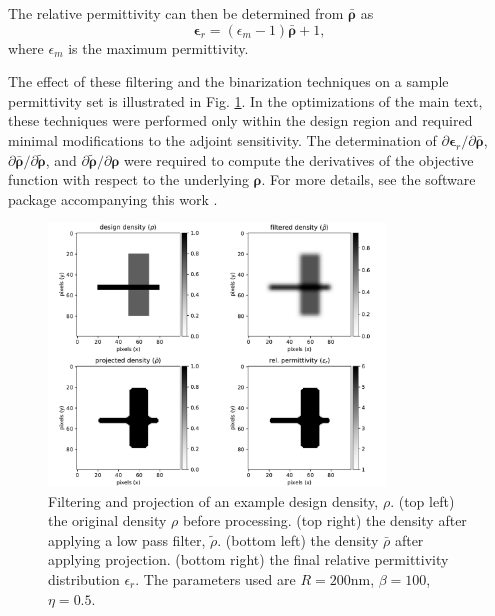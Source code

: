 The relative permittivity can then be determined from $\bm{\bar{\rho}}$ as
\begin{equation}
\bm{\epsilon}_r = (\epsilon_m - 1)\bm{\bar{\rho}} + 1,
\end{equation}
where $\epsilon_m$ is the maximum permittivity. 

The effect of these filtering and the binarization techniques on a sample permittivity set is illustrated in Fig. \ref{fig:filter}. In the optimizations of the main text, these techniques were performed only within the design region and required minimal modifications to the adjoint sensitivity.  The determination of $\partial \bm{\epsilon}_r / \partial \bm{\bar{\rho}}$, $\partial \bm{\bar{\rho}} / \partial \bm{\tilde{\rho}}$, and $\partial \bm{\tilde{\rho}} / \partial \bm{\rho}$ were required to compute the derivatives of the objective function with respect to the underlying $\bm{\rho}$.  For more details, see the software package accompanying this work \cite{hughes2018fdfdpy}.

\begin{figure}[!ht]
\centering
\includegraphics[width=0.8\textwidth]{figures/angler_filter.pdf}
\caption{\label{fig:filter} Filtering and projection of an example design density, $\rho$. (top left) the original density $\rho$ before processing.  (top right) the density after applying a low pass filter, $\tilde{\rho}$.  (bottom left) the density $\bar{\rho}$ after applying projection.  (bottom right) the final relative permittivity distribution $\epsilon_r$. The parameters used are $R = 200$nm, $\beta = 100$, $\eta = 0.5$.}
\end{figure}

